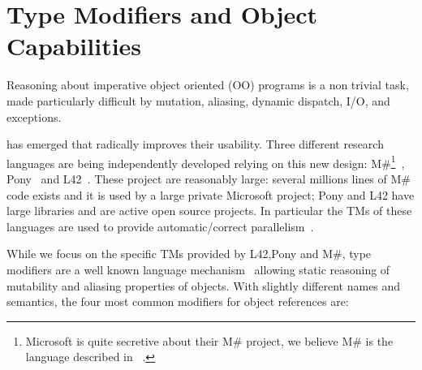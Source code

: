 \section{Type Modifiers and Object Capabilities}
\label{s:background}
Reasoning about imperative object oriented (OO) programs is a non trivial task,
made particularly difficult by mutation, aliasing, dynamic dispatch, I/O, and exceptions. 

 has emerged that radically improves their usability.
Three different research languages are being independently developed relying on this new design: {M\#}\footnote{Microsoft is quite secretive about their M\# project, we believe M\# is the language described in ~\cite{?}.}~\cite{?}, Pony~\cite{?} and L42~\cite{?}.
These project are reasonably large: several millions lines of M\# code exists and it is used by a large private Microsoft project; Pony and L42 have large libraries and are active open source projects. In particular the TMs of these languages are used to provide automatic/correct parallelism~\cite{GordonEtAl12,clebsch2015deny,clebsch2017orca,?}.

While we focus on the specific TMs provided by L42,Pony and M\#, type modifiers
 are a well known language mechanism~\cite{TschantzErnst05,BirkaErnst04,OstlundEtAl08,clebsch2015deny,GianniniEtAl16,GordonEtAl12}
 allowing static reasoning of mutability and aliasing properties of objects.
With slightly different names and semantics, the four most common modifiers for object references are:

